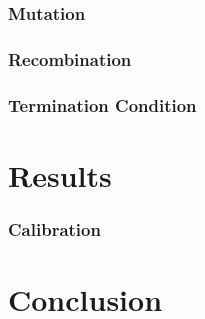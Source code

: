 \documentclass{article}
\begin{document}
\subsubsection{Mutation}


\subsubsection{Recombination}



\subsubsection{Termination Condition}


\section{Results} %




\subsubsection{Calibration}

\section{Conclusion} %
\end{document}
